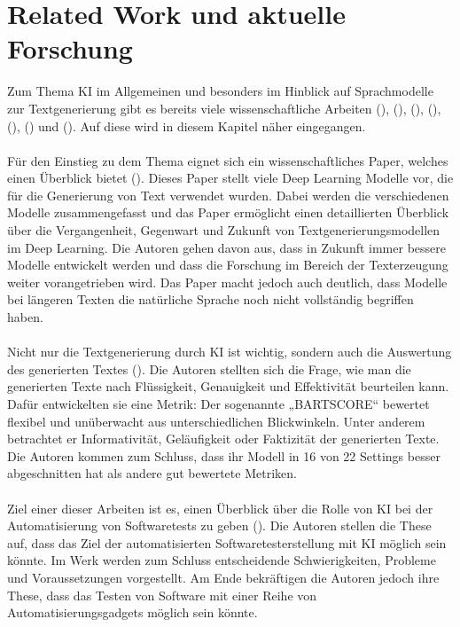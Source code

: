 \documentclass[12pt,toc=bib,toc=listof]{scrreprt}
\begin{document}
\chapter{Related Work und aktuelle Forschung} %
\label{sec:relatedWorkUndAktuelleForschung}
Zum Thema KI im Allgemeinen und besonders im Hinblick auf Sprachmodelle zur Textgenerierung gibt es bereits viele wissenschaftliche Arbeiten (\cite{Iqbal2022}), (\cite{Yuan2021}), (\cite{Khan2024}), (\cite{Bhandari2024}), (\cite{Gu2024}), (\cite{Chen2024}) und (\cite{Wang2024}). Auf diese wird in diesem Kapitel näher eingegangen.\\
\\
Für den Einstieg zu dem Thema eignet sich ein wissenschaftliches Paper, welches einen Überblick bietet (\cite{Iqbal2022}). Dieses Paper stellt viele Deep Learning Modelle vor, die für die Generierung von Text verwendet wurden. Dabei werden die verschiedenen Modelle zusammengefasst und das Paper ermöglicht einen detaillierten Überblick über die Vergangenheit, Gegenwart und Zukunft von Textgenerierungsmodellen im Deep Learning. Die Autoren gehen davon aus, dass in Zukunft immer bessere Modelle entwickelt werden und dass die Forschung im Bereich der Texterzeugung weiter vorangetrieben wird. Das Paper macht jedoch auch deutlich, dass Modelle bei längeren Texten die natürliche Sprache noch nicht vollständig begriffen haben.\\
\\
Nicht nur die Textgenerierung durch KI ist wichtig, sondern auch die Auswertung des generierten Textes (\cite{Yuan2021}). Die Autoren stellten sich die Frage, wie man die generierten Texte nach Flüssigkeit, Genauigkeit und Effektivität beurteilen kann. Dafür entwickelten sie eine Metrik: Der sogenannte „BARTSCORE“ bewertet flexibel und unüberwacht aus unterschiedlichen Blickwinkeln. Unter anderem betrachtet er Informativität, Geläufigkeit oder Faktizität der generierten Texte. Die Autoren kommen zum Schluss, dass ihr Modell in 16 von 22 Settings besser abgeschnitten hat als andere gut bewertete Metriken.\\
\\
Ziel einer dieser Arbeiten ist es, einen Überblick über die Rolle von KI bei der Automatisierung von Softwaretests zu geben (\cite{Khan2024}). Die Autoren stellen die These auf, dass das Ziel der automatisierten Softwaretesterstellung mit KI möglich sein könnte. Im Werk werden zum Schluss entscheidende Schwierigkeiten, Probleme und Voraussetzungen vorgestellt. Am Ende bekräftigen die Autoren jedoch ihre These, dass das Testen von Software mit einer Reihe von Automatisierungsgadgets möglich sein könnte.\\
\end{document}
